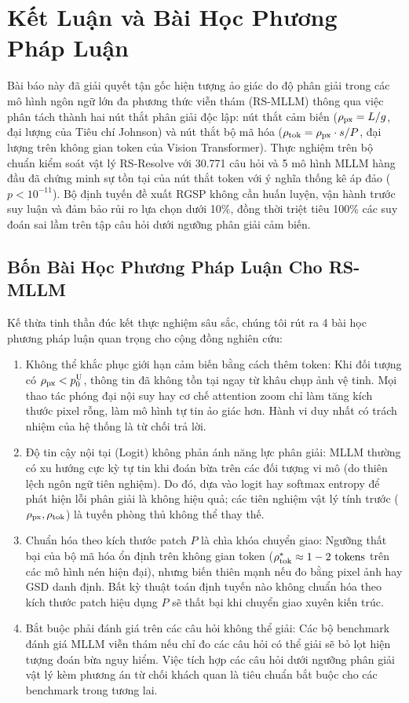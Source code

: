 \section{Kết Luận và Bài Học Phương Pháp Luận}
\label{sec:conclusion}

Bài báo này đã giải quyết tận gốc hiện tượng ảo giác do độ phân giải trong các mô hình ngôn ngữ lớn đa phương thức viễn thám (RS-MLLM) thông qua việc phân tách thành hai nút thắt phân giải độc lập: nút thắt cảm biến ($\rho_{\mathrm{px}} = L/g$, đại lượng của Tiêu chí Johnson) và nút thắt bộ mã hóa ($\rho_{\mathrm{tok}} = \rho_{\mathrm{px}} \cdot s/P$, đại lượng trên không gian token của Vision Transformer). Thực nghiệm trên bộ chuẩn kiểm soát vật lý RS-Resolve với 30.771 câu hỏi và 5 mô hình MLLM hàng đầu đã chứng minh sự tồn tại của nút thắt token với ý nghĩa thống kê áp đảo ($p < 10^{-11}$). Bộ định tuyến đề xuất RGSP không cần huấn luyện, vận hành trước suy luận và đảm bảo rủi ro lựa chọn dưới 10\%, đồng thời triệt tiêu 100\% các suy đoán sai lầm trên tập câu hỏi dưới ngưỡng phân giải cảm biến.

\subsection{Bốn Bài Học Phương Pháp Luận Cho RS-MLLM}
Kế thừa tinh thần đúc kết thực nghiệm sâu sắc, chúng tôi rút ra 4 bài học phương pháp luận quan trọng cho cộng đồng nghiên cứu:
\begin{enumerate}
    \item Không thể khắc phục giới hạn cảm biến bằng cách thêm token: Khi đối tượng có $\rho_{\mathrm{px}} < p_0^{\mathrm{U}}$, thông tin đã không tồn tại ngay từ khâu chụp ảnh vệ tinh. Mọi thao tác phóng đại nội suy hay cơ chế attention zoom chỉ làm tăng kích thước pixel rỗng, làm mô hình tự tin ảo giác hơn. Hành vi duy nhất có trách nhiệm của hệ thống là từ chối trả lời.
    \item Độ tin cậy nội tại (Logit) không phản ánh năng lực phân giải: MLLM thường có xu hướng cực kỳ tự tin khi đoán bừa trên các đối tượng vi mô (do thiên lệch ngôn ngữ tiên nghiệm). Do đó, dựa vào logit hay softmax entropy để phát hiện lỗi phân giải là không hiệu quả; các tiên nghiệm vật lý tính trước ($\rho_{\mathrm{px}}, \rho_{\mathrm{tok}}$) là tuyến phòng thủ không thể thay thế.
    \item Chuẩn hóa theo kích thước patch $P$ là chìa khóa chuyển giao: Ngưỡng thất bại của bộ mã hóa ổn định trên không gian token ($\rho_{\mathrm{tok}}^* \approx 1 - 2\text{ tokens}$ trên các mô hình nén hiện đại), nhưng biến thiên mạnh nếu đo bằng pixel ảnh hay GSD danh định. Bất kỳ thuật toán định tuyến nào không chuẩn hóa theo kích thước patch hiệu dụng $P$ sẽ thất bại khi chuyển giao xuyên kiến trúc.
    \item Bắt buộc phải đánh giá trên các câu hỏi không thể giải: Các bộ benchmark đánh giá MLLM viễn thám nếu chỉ đo các câu hỏi có thể giải sẽ bỏ lọt hiện tượng đoán bừa nguy hiểm. Việc tích hợp các câu hỏi dưới ngưỡng phân giải vật lý kèm phương án từ chối khách quan là tiêu chuẩn bắt buộc cho các benchmark trong tương lai.
\end{enumerate}

